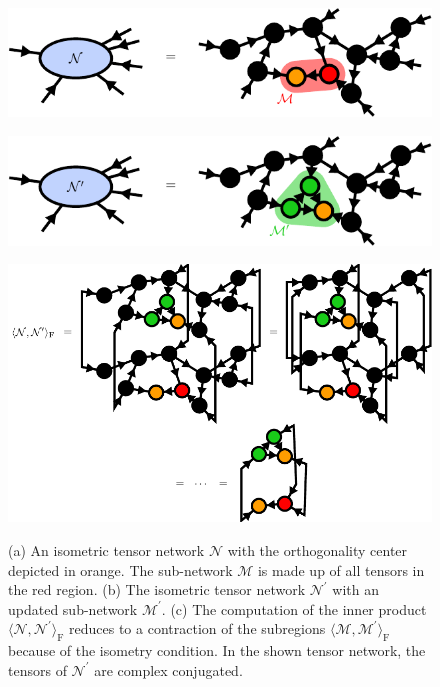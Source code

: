 \begin{figure}
	\centering
	\subcaptionbox{\label{fig:isometric_tensor_network_N}}
	{%
		\includegraphics[scale=1]{figures/tikz/Tensor_Networks/contractions_of_isometric_tensor_networks/contractions_of_isometric_tensor_networks_a.pdf}
	}
	\par\bigskip
	\subcaptionbox{\label{fig:isometric_tensor_network_N_prime}}
	{%
		\includegraphics[scale=1]{figures/tikz/Tensor_Networks/contractions_of_isometric_tensor_networks/contractions_of_isometric_tensor_networks_b.pdf}
	}
	\par\bigskip
	\subcaptionbox{\label{fig:isometric_tensor_network_norm_contraction}}
	{%
		\includegraphics[scale=1]{figures/tikz/Tensor_Networks/contractions_of_isometric_tensor_networks/contractions_of_isometric_tensor_networks_c.pdf}
	}
	\caption{(a) An isometric tensor network $\mathcal{N}$ with the orthogonality center depicted in orange. The sub-network $\mathcal{M}$ is made up of all tensors in the red region. (b) The isometric tensor network $\mathcal{N}^\prime$ with an updated sub-network $\mathcal{M}^\prime$. (c) The computation of the inner product $\langle\mathcal{N},\mathcal{N}^\prime\rangle_\text{F}$ reduces to a contraction of the subregions $\langle\mathcal{M},\mathcal{M}^\prime\rangle_\text{F}$ because of the isometry condition. In the shown tensor network, the tensors of $\mathcal{N}^\prime$ are complex conjugated.}
	\label{fig:isometric_tensor_network_local_approximation}
\end{figure}